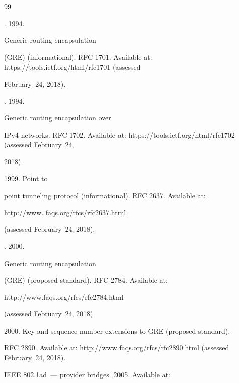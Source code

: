 {\small\frenchspacing


{%




\begin{thebibliography}{99}




  . 1994. 


  Generic routing encapsulation 


(GRE) (informational). RFC 1701. Available at: {\sf https://tools.ietf.org/html/rfc1701} (assessed 


February~24, 2018). 




. 1994. 


Generic routing encapsulation over 


IPv4 networks. RFC 1702.  Available at: {\sf https://tools.ietf.org/html/rfc1702} (assessed February~24, 


2018).






  1999. Point to 


point tunneling protocol (informational). RFC 2637. Available at: {\sf 


http://www. faqs.org/rfcs/rfc2637.html} (assessed February~24, 2018). 




  . 2000.  


  Generic routing encapsulation 


(GRE) (proposed standard).  RFC 2784. Available at: {\sf  


http://www.faqs.org/rfcs/rfc2784.html} (assessed February~24, 2018). 




 2000. Key and sequence number extensions to GRE (proposed standard). 


RFC 2890.  Available at: {\sf http://www.faqs.org/rfcs/rfc2890.html} (assessed February~24, 2018). 




  IEEE 802.1ad~--- provider bridges. 2005. Available at: {\sf 


}
\end{thebibliography}}}
